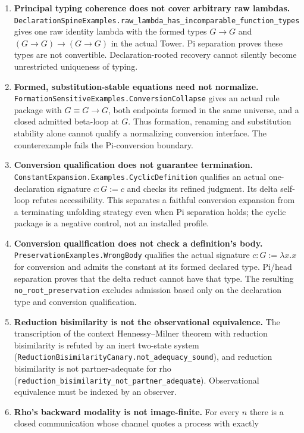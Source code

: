 \documentclass[11pt]{article}
\theoremstyle{definition}
\theoremstyle{remark}
\begin{document}
\begin{enumerate}
\item \textbf{Principal typing coherence does not cover arbitrary raw lambdas.}
  \nolinkurl{DeclarationSpineExamples.raw_lambda_has_incomparable_function_types}
  gives one raw identity lambda with the formed types $G\to G$ and
  $(G\to G)\to(G\to G)$ in the actual Tower. Pi separation proves these
  types are not convertible. Declaration-rooted recovery cannot silently
  become unrestricted uniqueness of typing.
\item \textbf{Formed, substitution-stable equations need not normalize.}
  \nolinkurl{FormationSensitiveExamples.ConversionCollapse} gives an actual
  rule package with $G\equiv G\to G$, both endpoints formed in the same
  universe, and a closed admitted beta-loop at $G$. Thus formation,
  renaming and substitution stability alone cannot qualify a normalizing
  conversion interface. The counterexample fails the Pi-conversion boundary.
\item \textbf{Conversion qualification does not guarantee termination.}
  \nolinkurl{ConstantExpansion.Examples.CyclicDefinition} qualifies an actual
  one-declaration signature $c:G:=c$ and checks its refined judgment. Its
  delta self-loop refutes accessibility. This separates a faithful conversion
  expansion from a terminating unfolding strategy even when Pi separation
  holds; the cyclic package is a negative control, not an installed profile.
\item \textbf{Conversion qualification does not check a definition's body.}
  \nolinkurl{PreservationExamples.WrongBody} qualifies the actual signature
  $c:G:=\lambda x.x$ for conversion and admits the constant at its formed
  declared type. Pi/head separation proves that the delta reduct cannot
  have that type. The resulting \nolinkurl{no_root_preservation} excludes
  admission based only on the declaration type and conversion qualification.
\item \textbf{Reduction bisimilarity is not the observational equivalence.}
  The transcription of the context Hennessy--Milner theorem with reduction
  bisimilarity is refuted by an inert two-state system
  (\nolinkurl{ReductionBisimilarityCanary.not_adequacy_sound}), and reduction
  bisimilarity is not partner-adequate for rho
  (\nolinkurl{reduction_bisimilarity_not_partner_adequate}).  Observational
  equivalence must be indexed by an observer.
\item \textbf{Rho's backward modality is not image-finite.}  For every $n$
  there is a closed communication whose channel quotes a process with exactly

\end{enumerate}
\end{document}
